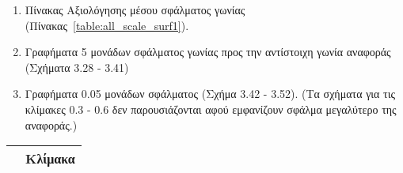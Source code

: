  \begin{enumerate}
 
   \item Πίνακας Aξιολόγησης μέσου σφάλματος γωνίας (Πίνακας~\ref{table:all_scale_surf1}).
   \item Γραφήματα 5 μονάδων σφάλματος γωνίας προς την αντίστοιχη γωνία αναφοράς (Σχήματα 3.28 - 3.41)
   \item Γραφήματα 0.05 μονάδων σφάλματος (Σχήμα 3.42 - 3.52). (Τα σχήματα για τις κλίμακες 0.3 - 0.6 δεν παρουσιάζονται αφού εμφανίζουν σφάλμα μεγαλύτερο της αναφοράς.)
 
 \end{enumerate}
 
\begin{sidewaystable}[!htbp]

 \centering

\small\begin{tabular}{c|cccccccccccccc|}


  \cline{2-15}

   &  \multicolumn{14}{c|}{\textbf{Κλίμακα}}\\ \hline

 
 

\end{tabular}
\end{sidewaystable}
